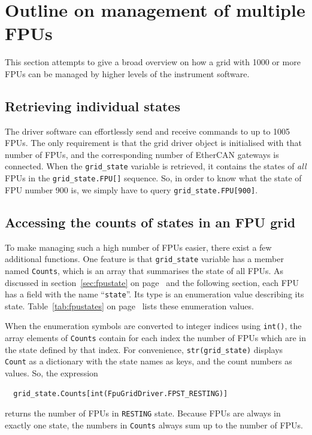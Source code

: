 \documentclass[11pt,a4paper]{report}
\begin{document}
\section{Outline on management of multiple FPUs}
This section attempts to give a broad overview on how a grid with 1000
or more FPUs can be managed by higher levels of the instrument
software.

\subsection{Retrieving individual states}
The driver software can effortlessly send and receive commands to up
to 1005 FPUs. The only requirement is that the grid driver object is
initialised with that number of FPUs, and the corresponding number of
EtherCAN gateways is connected. When the \texttt{grid\_state} variable
is retrieved, it contains the states of \emph{all} FPUs in the
\verb+grid_state.FPU[]+ sequence. So, in order to know what the state
of FPU number 900 is, we simply have to query
\verb+grid_state.FPU[900]+.

\subsection{Accessing the counts of states in an FPU grid}
To make managing such a high number of FPUs easier, there exist a few
additional functions. One feature is that \texttt{grid\_state}
variable has a member named \texttt{Counts}, which is an array that
summarises the state of all FPUs. As discussed in
section~\ref{sec:fpustate} on page~\pageref{sec:fpustate} and the
following section, each FPU has a field with the name
``\texttt{state}''. Its type is an enumeration value describing its
state. Table~\ref{tab:fpustates} on page~\pageref{tab:fpustates} lists
these enumeration values.

When the enumeration symbols are converted to integer indices using
\texttt{int()}, the array elements of \texttt{Counts} contain for each
index the number of FPUs which are in the state defined by that
index. For convenience, \texttt{str(grid\_state)} displays
\texttt{Count} as a dictionary with the state names as keys, and the
count numbers as values. So, the expression
\begin{verbatim}
  grid_state.Counts[int(FpuGridDriver.FPST_RESTING)]
\end{verbatim}
returns the number of FPUs in \texttt{RESTING} state. Because FPUs are
always in exactly one state, the numbers in \texttt{Counts} always sum
up to the number of FPUs.
\end{document}

